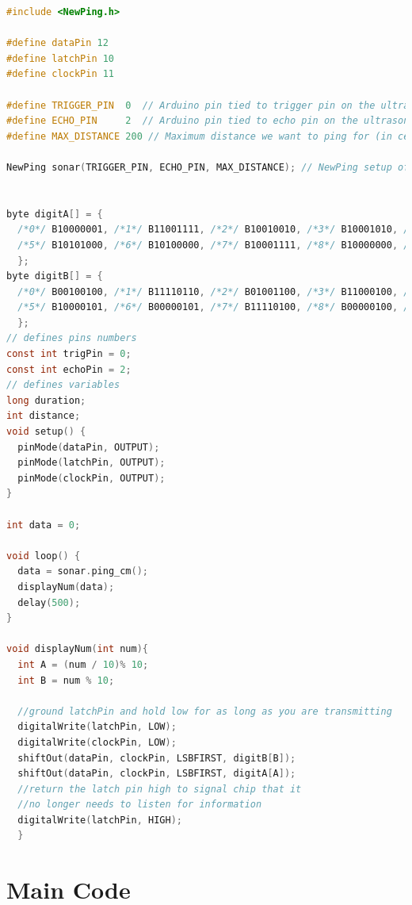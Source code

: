   \begin{lstlisting}[language=c,caption={Sensor testing code C},label={lst:sensor_test_c}]
#include <NewPing.h>

#define dataPin 12
#define latchPin 10
#define clockPin 11

#define TRIGGER_PIN  0  // Arduino pin tied to trigger pin on the ultrasonic sensor.
#define ECHO_PIN     2  // Arduino pin tied to echo pin on the ultrasonic sensor.
#define MAX_DISTANCE 200 // Maximum distance we want to ping for (in centimeters). Maximum sensor distance is rated at 400-500cm.

NewPing sonar(TRIGGER_PIN, ECHO_PIN, MAX_DISTANCE); // NewPing setup of pins and maximum distance.


byte digitA[] = {
  /*0*/ B10000001, /*1*/ B11001111, /*2*/ B10010010, /*3*/ B10001010, /*4*/ B11001100,
  /*5*/ B10101000, /*6*/ B10100000, /*7*/ B10001111, /*8*/ B10000000, /*9*/ B10001000,
  };
byte digitB[] = {
  /*0*/ B00100100, /*1*/ B11110110, /*2*/ B01001100, /*3*/ B11000100, /*4*/ B10010110,
  /*5*/ B10000101, /*6*/ B00000101, /*7*/ B11110100, /*8*/ B00000100, /*9*/ B10000100
  };
// defines pins numbers
const int trigPin = 0;
const int echoPin = 2;
// defines variables
long duration;
int distance;
void setup() {
  pinMode(dataPin, OUTPUT);
  pinMode(latchPin, OUTPUT);
  pinMode(clockPin, OUTPUT);
}

int data = 0;

void loop() {
  data = sonar.ping_cm();
  displayNum(data);
  delay(500);
}

void displayNum(int num){
  int A = (num / 10)% 10; 
  int B = num % 10;

  //ground latchPin and hold low for as long as you are transmitting
  digitalWrite(latchPin, LOW);
  digitalWrite(clockPin, LOW);
  shiftOut(dataPin, clockPin, LSBFIRST, digitB[B]);
  shiftOut(dataPin, clockPin, LSBFIRST, digitA[A]);
  //return the latch pin high to signal chip that it
  //no longer needs to listen for information
  digitalWrite(latchPin, HIGH);
  }
\end{lstlisting}


	\section{Main Code}
	
